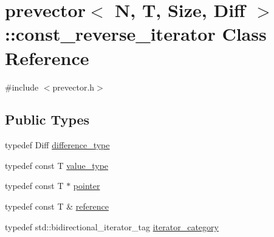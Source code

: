 \hypertarget{classprevector_1_1const__reverse__iterator}{}\section{prevector$<$ N, T, Size, Diff $>$\+:\+:const\+\_\+reverse\+\_\+iterator Class Reference}
\label{classprevector_1_1const__reverse__iterator}


{\ttfamily \#include $<$prevector.\+h$>$}

\subsection*{Public Types}
\begin{DoxyCompactItemize}
\item 
typedef Diff \mbox{\hyperlink{classprevector_1_1const__reverse__iterator_a9dbda696cb2dcbe5ea56dcbdd47976d9}{difference\+\_\+type}}
\item 
typedef const T \mbox{\hyperlink{classprevector_1_1const__reverse__iterator_ade957c473a494e6d51f240459e8a233f}{value\+\_\+type}}
\item 
typedef const T $\ast$ \mbox{\hyperlink{classprevector_1_1const__reverse__iterator_a8e9d9876d10d29e9e33a26c561da2574}{pointer}}
\item 
typedef const T \& \mbox{\hyperlink{classprevector_1_1const__reverse__iterator_ac1a9b32b13a1c9f79c7a69b136c9517b}{reference}}
\item 
typedef std\+::bidirectional\+\_\+iterator\+\_\+tag \mbox{\hyperlink{classprevector_1_1const__reverse__iterator_a95e256c2f41ed8b914677594e6f22352}{iterator\+\_\+category}}
\end{DoxyCompactItemize}
